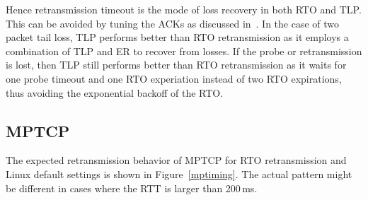 \documentclass[10pt,conference]{IEEEtran}
\begin{document}
Hence retransmission timeout is the mode of loss recovery in both RTO and TLP. This can be avoided by tuning the ACKs as discussed 
in~\cite{Rajiullah:2015}. In the case of two packet tail loss, TLP performs better than RTO retransmission as it employs a combination of TLP 
and ER to recover from losses. If the probe or retransmission is lost, then TLP still performs better than RTO retransmission as it waits for one 
probe timeout and one RTO experiation instead of two RTO expirations, thus avoiding the exponential backoff of the RTO.

\subsection{MPTCP}


The expected retransmission behavior of MPTCP for RTO retransmission and Linux default settings is shown 
in Figure~\ref{mptiming}. The actual pattern might be different in cases where the RTT is larger than 200\,ms. 
\end{document}
